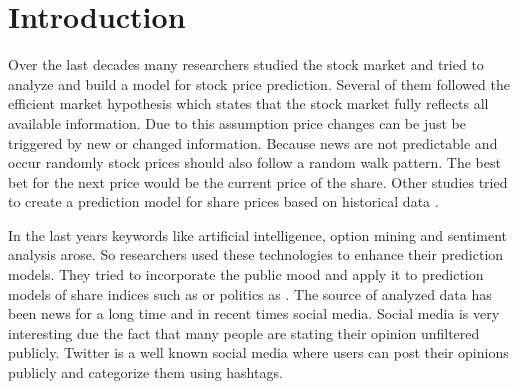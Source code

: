




\clearpage

\section{Introduction}
Over the last decades many researchers studied the stock market and tried to analyze and build a model for stock price prediction.
Several of them followed the efficient market hypothesis \cite{Basu1977,Fama1995,Malkiel2003} which states that the stock market fully reflects all available information.
Due to this assumption price changes can be just be triggered by new or changed information.
Because news are not predictable and occur randomly stock prices should also follow a random walk pattern.
The best bet for the next price would be the current price of the share. 
Other studies tried to create a prediction model for share prices based on historical data \cite{Nguyen2015a}.

In the last years keywords like artificial intelligence, option mining and sentiment analysis arose.
So researchers used these technologies to enhance their prediction models.
They tried to incorporate the public mood and apply it to prediction models of share indices such as \cite{Bollen2011a,Mittal2012a,Nguyen2015a,Pagolu2016a,Zhang2011a} or politics as \cite{Oconnor2010a,Patodkar2016a}.
The source of analyzed data has been news for a long time and in recent times social media.
Social media is very interesting due the fact that many people are stating their opinion unfiltered publicly.
Twitter is a well known social media where users can post their opinions publicly and categorize them using hashtags.

